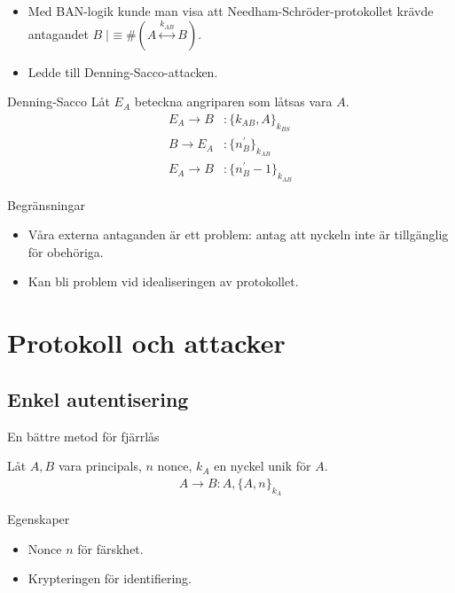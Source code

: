 \documentclass{beamer}
\theoremstyle{definition}
\theoremstyle{remark}
\DeclareMathOperator{\believes}{|\!\!\!\equiv}
\newcommand{\fresh}[1]{\#(#1)}
\newcommand{\encrypt}[2]{\{#1\}_{#2}}
\newcommand{\share}[1]{\stackrel{#1}{\leftrightarrow}}
\begin{document}
\begin{frame}
  \begin{itemize}
    \item Med BAN-logik kunde man visa att Needham-Schröder-protokollet krävde 
      antagandet \(B\believes \fresh{A\share{k_{AB}} B}\).
    \item Ledde till Denning-Sacco-attacken.
  \end{itemize}
  \begin{block}{Denning-Sacco}
    Låt \(E_A\) beteckna angriparen som låtsas vara \(A\).
    \begin{align*}
      E_A\to B &\colon \encrypt{k_{AB}, A}{k_{BS}} \\
      B\to E_A &\colon \encrypt{n_B^\prime}{k_{AB}} \\
      E_A\to B &\colon \encrypt{n_B^\prime-1}{k_{AB}}
    \end{align*}
  \end{block}
\end{frame}

\begin{frame}{Begränsningar}
  \begin{itemize}
    \item Våra externa antaganden är ett problem: antag att nyckeln inte är 
      tillgänglig för obehöriga.

    \item Kan bli problem vid idealiseringen av protokollet.

  \end{itemize}
\end{frame}


\section{Protokoll och attacker}

\subsection{Enkel autentisering}

\begin{frame}{En bättre metod för fjärrlås}
  \begin{example}[Fjärrlås]
    Låt \(A, B\) vara principals, \(n\) nonce, \(k_A\) en nyckel unik för 
    \(A\).
    \begin{align*}
      A\to B\colon A, \encrypt{A, n}{k_A}
    \end{align*}
  \end{example}
  \begin{block}{Egenskaper}
    \begin{itemize}
      \item Nonce \(n\) för färskhet.
      \item Krypteringen för identifiering.
    \end{itemize}
  \end{block}
\end{frame}
\end{document}
